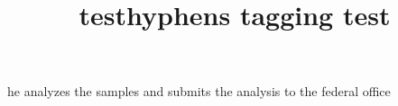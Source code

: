 \documentclass{article}
\title{testhyphens tagging test}
\begin{document}
\begin{checkhyphens}
he analyzes the samples and submits the analysis to the federal office
\end{checkhyphens}

\end{document}
